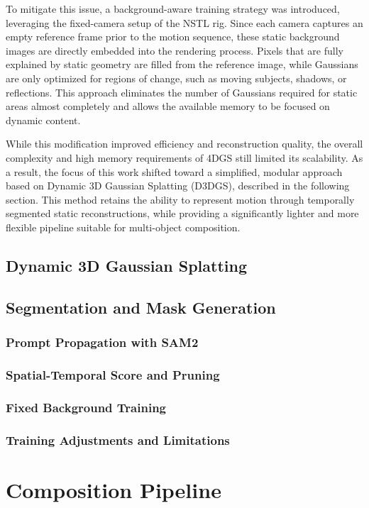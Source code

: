 To mitigate this issue, a background-aware training strategy was introduced, leveraging the fixed-camera setup of the NSTL rig. 
Since each camera captures an empty reference frame prior to the motion sequence, these static background images are directly embedded into the rendering process. 
Pixels that are fully explained by static geometry are filled from the reference image, while Gaussians are only optimized for regions of change, such as moving subjects, shadows, or reflections. 
This approach eliminates the number of Gaussians required for static areas almost completely and allows the available memory to be focused on dynamic content.

While this modification improved efficiency and reconstruction quality, the overall complexity and high memory requirements of 4DGS still limited its scalability. 
As a result, the focus of this work shifted toward a simplified, modular approach based on Dynamic 3D Gaussian Splatting (D3DGS), described in the following section. 
This method retains the ability to represent motion through temporally segmented static reconstructions, while providing a significantly lighter and more flexible pipeline suitable for multi-object composition.


\subsection{Dynamic 3D Gaussian Splatting}
\subsection{Segmentation and Mask Generation}
\subsubsection{Prompt Propagation with SAM2}
\subsubsection{Spatial-Temporal Score and Pruning}
\subsubsection{Fixed Background Training}
\subsubsection{Training Adjustments and Limitations}



\section{Composition Pipeline}
\label{sec:compositionpipeline}

